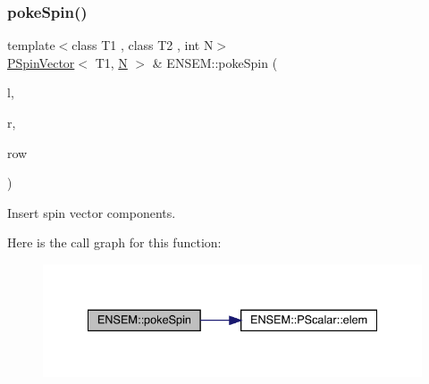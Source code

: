 \mbox{\label{group__primspinvector_ga55ef7594c5803a6f510d30a63e5aab4b}} 
\subsubsection{\texorpdfstring{pokeSpin()}{pokeSpin()}}
{\footnotesize\ttfamily template$<$class T1 , class T2 , int N$>$ \\
\mbox{\hyperlink{classENSEM_1_1PSpinVector}{P\+Spin\+Vector}}$<$ T1, \mbox{\hyperlink{operator__name__util_8cc_a7722c8ecbb62d99aee7ce68b1752f337}{N}} $>$ \& E\+N\+S\+E\+M\+::poke\+Spin (\begin{DoxyParamCaption}\item[{\mbox{\hyperlink{classENSEM_1_1PSpinVector}{P\+Spin\+Vector}}$<$ T1, \mbox{\hyperlink{operator__name__util_8cc_a7722c8ecbb62d99aee7ce68b1752f337}{N}} $>$ \&}]{l,  }\item[{const \mbox{\hyperlink{classENSEM_1_1PScalar}{P\+Scalar}}$<$ T2 $>$ \&}]{r,  }\item[{int}]{row }\end{DoxyParamCaption})\hspace{0.3cm}{\ttfamily [inline]}}



Insert spin vector components. 

Here is the call graph for this function\+:\nopagebreak
\begin{figure}[H]
\begin{center}
\leavevmode
\includegraphics[width=334pt]{dd/d6d/group__primspinvector_ga55ef7594c5803a6f510d30a63e5aab4b_cgraph}
\end{center}
\end{figure}
